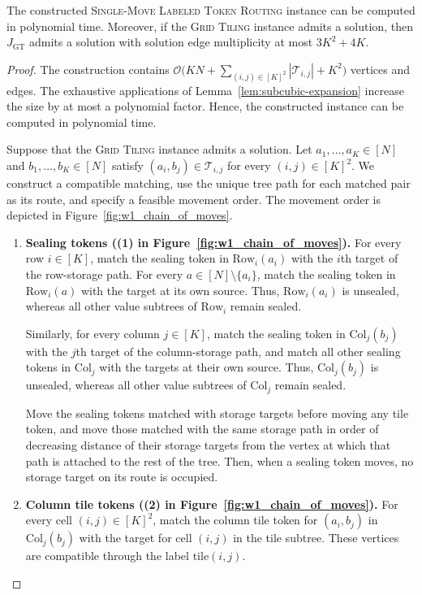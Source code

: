 \documentclass[a4paper,USenglish,thm-restate]{lipics-v2021}
\newcommand{\rowsub}{\mathrm{Row}}
\newcommand{\colsub}{\mathrm{Col}}
\theoremstyle{problemstyle}
\begin{document}
\begin{lemma}\label{lem:forward-solution-multiplicity}
The constructed \textsc{Single-Move Labeled Token Routing} instance can be computed in polynomial time. Moreover, if the \textsc{Grid Tiling} instance admits a solution, then $J_{\mathrm{GT}}$ admits a solution with solution edge multiplicity at most $3K^2+4K$.
\end{lemma}

\begin{proof}
The construction contains $\mathcal{O}\bigl(KN+\sum_{(i,j)\in[K]^2}|\mathcal{T}_{i,j}|+K^2\bigr)$ vertices and edges. The exhaustive applications of Lemma~\ref{lem:subcubic-expansion} increase the size by at most a polynomial factor. Hence, the constructed instance can be computed in polynomial time.

Suppose that the \textsc{Grid Tiling} instance admits a solution. Let $a_1,\ldots,a_K\in[N]$ and $b_1,\ldots,b_K\in[N]$ satisfy $(a_i,b_j)\in \mathcal{T}_{i,j}$ for every $(i,j)\in[K]^2$. We construct a compatible matching, use the unique tree path for each matched pair as its route, and specify a feasible movement order. The movement order is depicted in Figure~\ref{fig:w1_chain_of_moves}.

\begin{enumerate}
\item \textbf{Sealing tokens ((1) in Figure~\ref{fig:w1_chain_of_moves}).}
For every row $i\in[K]$, match the sealing token in $\rowsub_i(a_i)$ with the $i$th target of the row-storage path. For every $a\in[N]\setminus\{a_i\}$, match the sealing token in $\rowsub_i(a)$ with the target at its own source. Thus, $\rowsub_i(a_i)$ is unsealed, whereas all other value subtrees of $\rowsub_i$ remain sealed.

Similarly, for every column $j\in[K]$, match the sealing token in $\colsub_j(b_j)$ with the $j$th target of the column-storage path, and match all other sealing tokens in $\colsub_j$ with the targets at their own source. Thus, $\colsub_j(b_j)$ is unsealed, whereas all other value subtrees of $\colsub_j$ remain sealed.

Move the sealing tokens matched with storage targets before moving any tile
token, and move those matched with the same storage path in order of
decreasing distance of their storage targets from the vertex at which that
path is attached to the rest of the tree. Then, when a sealing token moves, no
storage target on its route is occupied.

\item \textbf{Column tile tokens ((2) in Figure~\ref{fig:w1_chain_of_moves}).}
For every cell $(i,j)\in[K]^2$, match the column tile token for $(a_i,b_j)$ in $\colsub_j(b_j)$ with the target for cell $(i,j)$ in the tile subtree. These vertices are compatible through the label $\mathrm{tile}(i,j)$.


\end{enumerate}
\end{proof}
\end{document}
